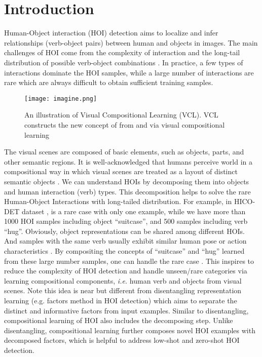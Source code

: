 \documentclass[runningheads]{llncs}
\newcommand{\ie}{\textit{i.e. }}
\begin{document}
\section{Introduction}
Human-Object interaction (HOI) detection \cite{chao2018learning, gao2018ican, li2018transferable, qi2018learning} aims to localize and infer relationships (verb-object pairs) between human and objects in images.
The main challenges of HOI come from the complexity of interaction and the long-tail distribution of possible verb-object combinations \cite{chao2018learning, shen2018scaling, xu2019learning}.
In practice, a few types of interactions dominate the HOI samples,
while a large number of interactions are rare which are always difficult to obtain sufficient training samples.

\begin{figure}[t]
\begin{center}
\texttt{[image: imagine.png]}
\end{center}
   \caption{An illustration of Visual Compositional Learning (VCL). VCL constructs the new concept of  from  and  via visual compositional learning}
\label{fig:imagine}
\end{figure}

The visual scenes are composed of basic elements, such as objects, parts, and other semantic regions.
It is well-acknowledged that humans perceive world in a compositional way in which visual scenes are treated as a layout of distinct semantic objects \cite{spelke1990principles, hoffman1983parts}. We can understand HOIs by decomposing them into objects and human interaction (verb) types. This decomposition helps to solve the rare Human-Object Interactions with long-tailed distribution. For example, in HICO-DET dataset \cite{chao2018learning},  is a rare case with only one example, while we have more than 1000 HOI samples including object ``suitcase'', and 500 samples including verb ``hug''. Obviously, object representations can be shared among different HOIs. And samples with the same verb usually exhibit similar human pose or action characteristics \cite{xu2019learning}. By compositing the concepts of ``suitcase'' and ``hug'' learned from these large number samples, one can handle the rare case . This inspires to reduce the complexity of HOI detection and handle unseen/rare categories via learning compositional components, \ie human verb and objects from visual scenes. Note this idea is near but different from disentangling representation learning \cite{bengio2013representation} (e.g. factors method \cite{shen2018scaling} in HOI detection) which aims to separate the distinct and informative factors from input examples. Similar to disentangling, compositional learning of HOI also includes the decomposing step. Unlike disentangling, compositional learning further composes novel HOI examples with decomposed factors, which is helpful to address low-shot and zero-shot HOI detection.
\end{document}
